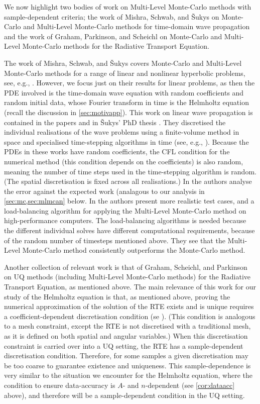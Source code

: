 We now highlight two bodies of work on Multi-Level Monte-Carlo methods with sample-dependent criteria; the work of Mishra, Schwab, and \v{S}ukys on Monte-Carlo and Multi-Level Monte-Carlo methods for time-domain wave propagation and the work of Graham, Parkinson, and Scheichl on Monte-Carlo and Multi-Level Monte-Carlo methods for the Radiative Transport Equation.

The work of Mishra, Schwab, and \v{S}ukys covers Monte-Carlo and Multi-Level Monte-Carlo methods for a range of linear and nonlinear hyperbolic problems, see, e.g., \cite{Su:14}. However, we focus just on their results for linear problems, as then the PDE involved is the time-domain wave equation with random coefficients and random initial data, whose Fourier transform in time is the Helmholtz equation (recall the discussion in \cref{sec:motivapp}). This work on linear wave propagation is contained in the papers \cite{SuMiSc:13,MiScSu:16} and in \v{S}ukys' PhD thesis \cite{Su:14}. They discretised the individual realisations of the wave problems using a finite-volume method in space and specialised time-stepping algorithms in time (see, e.g., \cite[Section 3.1]{MiScSu:16}). Because the PDEs in these works have random coefficients, the CFL condition for the numerical method (this condition depends on the coefficients) is also random, meaning the number of time steps used in the time-stepping algorithm is random. (The spatial discretisation is fixed across all realisations.) In \cite{SuMiSc:13} the authors analyse the error against the expected work (analagous to our analysis in \cref{sec:mc,sec:mlmcan} below. In \cite{MiScSu:16} the authors present more realistic test cases, and a load-balancing algorithm for applying the Multi-Level Monte-Carlo method on high-performance computers. The load-balancing algorithms is needed because the different individual solves have different computational requirements, because of the random number of timesteps mentioned above. They see that the Multi-Level Monte-Carlo method consistently outperforms the Monte-Carlo method.

Another collection of relevant work is that of Graham, Scheichl, and Parkinson \cite{GrPaSc:18,Pa:18,GrPaSc:19} on UQ methods (including Multi-Level Monte-Carlo methods) for the Radiative Transport Equation, as mentioned above. The main relevance of this work for our study of the Helmholtz equation is that, as mentioned above, proving the numerical approximation of the solution of the RTE exists and is unique requires a coefficient-dependent discretisation condition (se \cite[Theorem 4.12]{GrPaSc:19}). (This condition is analogous to a mesh constraint, except the RTE is not discretised with a traditional mesh, as it is defined on both spatial and angular variables.) When this discretisation constraint is carried over into a UQ setting, the RTE has a sample-dependent discretisation condition. Therefore, for some samples a given discretisation may be too coarse to guarantee existence and uniqueness. This sample-dependence is very similar to the situation we encounter for the Helmholtz equation, where the condition to ensure data-accuracy is $A$- and $n$-dependent (see \cref{cor:dataacc} above), and therefore will be a sample-dependent condition in the UQ setting.


